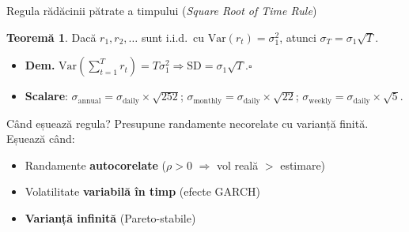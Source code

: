 \documentclass[9pt, aspectratio=169, t]{beamer}
\theoremstyle{definition}
\newtheorem{thm}{Teoremă}
\newcommand{\Var}{\text{Var}}
\begin{document}
\begin{frame}[shrink=3]{Regula rădăcinii pătrate a timpului (\textit{Square Root of Time Rule})}
\begin{thm}
Dacă $r_1, r_2, \ldots$ sunt i.i.d.\ cu $\Var(r_t) = \sigma_1^2$, atunci $\sigma_T = \sigma_1 \sqrt{T}.$
\end{thm}
\vspace{-0.15cm}
\begin{itemize}\footnotesize\setlength{\itemsep}{0pt}
    \item \textbf{Dem.}\; $\Var(\sum_{t=1}^T r_t) = T\sigma_1^2 \Rightarrow \text{SD} = \sigma_1\sqrt{T}$.\hfill$\square$
    \item \textbf{Scalare}: $\sigma_{\text{annual}} = \sigma_{\text{daily}} \!\times\! \sqrt{252}$;\; $\sigma_{\text{monthly}} = \sigma_{\text{daily}} \!\times\! \sqrt{22}$;\; $\sigma_{\text{weekly}} = \sigma_{\text{daily}} \!\times\! \sqrt{5}$.
\end{itemize}
\vspace{0.02cm}
\begin{alertblock}{Când eșuează regula?}
\footnotesize
Presupune randamente necorelate cu varianță finită. Eșuează când:
\begin{itemize}\setlength{\itemsep}{0pt}
    \item Randamente \textbf{autocorelate} ($\rho > 0$ $\Rightarrow$ vol reală $>$ estimare)
    \item Volatilitate \textbf{variabilă în timp} (efecte GARCH)
    \item \textbf{Varianță infinită} (Pareto-stabile)
\end{itemize}
\end{alertblock}
\end{frame}
\end{document}
